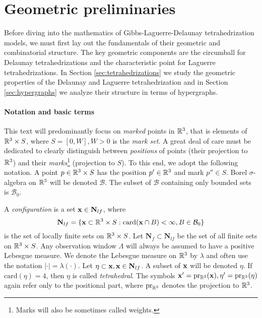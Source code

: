 \chapter{Geometric preliminaries}\label{ch:1}





Before diving into the mathematics of Gibbs-Laguerre-Delaunay tetrahedrization models, we must first lay out the fundamentals of their geometric and combinatorial structure. The key geometric components are the circumball for Delaunay tetrahedrizations and the characteristic point for Laguerre tetrahedrizations. 
In Section \ref{sec:tetrahedrizations} we study the geometric properties of the Delaunay and Laguerre tetrahedrization and in Section \ref{sec:hypergraphs} we analyze their structure in terms of hypergraphs.








\subsubsection{Notation and basic terms}
This text will predominantly focus on \textit{marked} points in ${\mathbb R^3}$, that is elements of ${\mathbb R^3} \times S$, where $S=[0,W],W>0$ is the \textit{mark set}. A great deal of care must be dedicated to clearly distinguish between \textit{positions} of points (their projection to ${\mathbb R^3}$) and their \textit{marks}\footnote{Marks will also be sometimes called weights.} (projection to $S$). To this end, we adopt the following notation. A point $p \in {\mathbb R^3}\times S$ has the position $p'\in {\mathbb R^3}$ and mark $p'' \in S$. Borel $\sigma$-algebra on ${\mathbb R^3}$ will be denoted $\mathcal B$. The subset of $\mathcal B$ containing only bounded sets is $\mathcal B_0$. 

A \textit{configuration} is a set ${\mathbf{x}} \in \mathbf N_{lf}$, where 
$$\mathbf N_{lf} = \{{\mathbf{x}} \subset {\mathbb R^3}\times S: \mathrm{card}({\mathbf{x}} \cap B) < \infty, B\in \mathcal B_0\} $$ 
is the set of locally finite sets on ${\mathbb R^3}\times S$. Let $\mathbf N_{f} \subset \mathbf N_{lf}$ be the set of all finite sets on ${\mathbb R^3}\times S$. 
 Any observation window $\Lambda$ will always be assumed to have a positive Lebesgue measure. We denote the Lebesgue measure on ${\mathbb R^3}$ by $\lambda$ and often use the notation $|\cdot|=\lambda(\cdot)$.
Let $\eta\subset{\mathbf{x}}, {\mathbf{x}} \in \mathbf N_{lf}$. A subset of ${\mathbf{x}}$ will be denoted $\eta$. If $\mathrm{card}(\eta)=4$, then $\eta$ is called \textit{tetrahedral}. The symbols ${\mathbf{x}}'=\mathrm{pr_{{\mathbb R^3}}}({\mathbf{x}}), \eta'=\mathrm{pr_{{\mathbb R^3}}}(\eta)$ again refer only to the positional part, where $\mathrm{pr}_{\mathbb R^3}$ denotes the projection to ${\mathbb R^3}$. 

